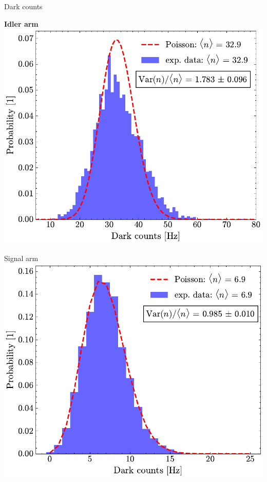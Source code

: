 \documentclass[10pt,aspectratio=43]{beamer}
\begin{document}
	\begin{frame}{Dark counts}
		\begin{minipage}{.45\textwidth}
			\centering
			\textbf{Idler arm}
			\vspace{2em}
			\includegraphics[width=\textwidth]{Images/DC_Idl_2.pdf}
		\end{minipage}
		\hfill
		\begin{minipage}{.45\textwidth}
			\centering
			Signal arm
			\vspace{2em}
			\includegraphics[width=\textwidth]{Images/DC_Sig_2.pdf}
		\end{minipage}
	\end{frame}
	
\end{document}
